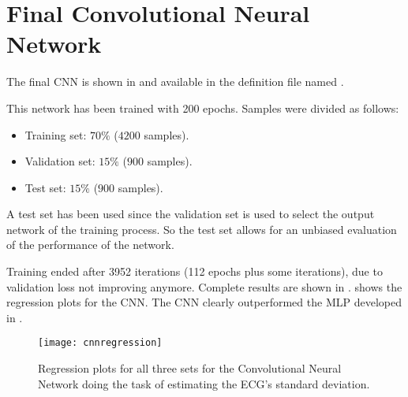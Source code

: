 \section{Final Convolutional Neural Network}\label{sec:cnnfinalcnn}

The final CNN is shown in  and available in the definition
file named .



This network has been trained with 200 epochs. Samples were divided as follows:
\begin{itemize}
\item Training set: \(70\%\) (\(4200\) samples).
\item Validation set: \(15\%\) (\(900\) samples).
\item Test set: \(15\%\) (\(900\) samples).
\end{itemize}

A test set has been used since the validation set is used to select the output
network of the training process. So the test set allows for an unbiased
evaluation of the performance of the network.

Training ended after 3952 iterations (112 epochs plus some iterations), due to
validation loss not improving anymore. Complete results are shown in
.  shows the regression plots
for the CNN. The CNN clearly outperformed the MLP developed in .



\begin{figure}[htbp]
	\centering
	\texttt{[image: cnnregression]}
	\caption{Regression plots for all three sets for the Convolutional
	Neural Network doing the task of estimating the ECG's standard
	deviation.}\label{fig:cnnregression}
\end{figure}
